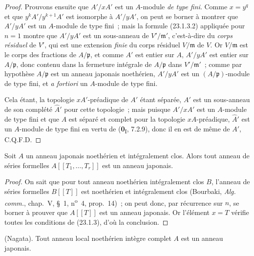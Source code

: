 \begin{proof}
Prouvons ensuite que $A'/xA'$ est un $A$-module \emph{de type fini}. Comme $x=y^q$
et que $y^kA'/y^{k+1}A'$ est isomorphe à $A'/yA'$, on peut se borner à
montrer que $A'/yA'$ est un $A$-module de type fini~; mais la formule
(23.1.3.2) appliquée pour $n=1$ montre que $A'/yA'$ est un sous-anneau de
$V'/\mathfrak m'$, c'est-à-dire du \emph{corps résiduel} de $V'$, qui est une
extension \emph{finie} du corps résiduel $V/\mathfrak m$ de $V$. Or
$V/\mathfrak m$ est le corps des fractions de $A/\mathfrak p$, et comme
$A'$ est entier sur $A$, $A'/yA'$ est entier sur $A/\mathfrak p$, donc
contenu dans la fermeture intégrale de $A/\mathfrak p$ dans
$V'/\mathfrak m'$~; comme par hypothèse $A/\mathfrak p$ est un anneau
japonais noethérien, $A'/yA'$ est un $(A/\mathfrak p)$-module de type fini,
et \emph{a fortiori} un $A$-module de type fini.

Cela étant, la topologie $xA'$-préadique de $A'$ étant séparée, $A'$ est un
sous-anneau de son complété $\widehat{A}'$ pour cette topologie~; mais puisque
$A'/xA'$ est un $A$-module de type fini et que $A$ est séparé et complet pour
la topologie $xA$-préadique, $\widehat{A}'$ est un $A$-module de type fini en
vertu de (\textbf{0}\textsubscript{I}, 7.2.9), donc il en est de même de $A'$, C.Q.F.D.
\end{proof}

\begin{corollary}[23.1.4]
\label{0.23.1.4-fr}
Soit $A$ un anneau japonais noethérien et intégralement clos. Alors tout
anneau de séries formelles $A[[T_1,\ldots,T_r]]$ est un anneau japonais.
\end{corollary}

\begin{proof}
On sait que pour tout anneau noethérien intégralement clos $B$, l'anneau de
séries formelles $B[[T]]$ est noethérien et intégralement clos (Bourbaki,
\emph{Alg. comm.}, chap.~V, §~1, n\textsuperscript{o}~4, prop.~14)~; on peut
donc, par récurrence sur $n$, se borner à prouver que $A[[T]]$ est un anneau
japonais. Or l'élément $x=T$ vérifie toutes les conditions de (23.1.3), d'où
la conclusion.
\end{proof}

\begin{theorem}[23.1.5]
\label{0.23.1.5-fr}
\textnormal{(Nagata).} Tout anneau local noethérien intègre \textup{complet} $A$ est
un anneau japonais.
\end{theorem}

